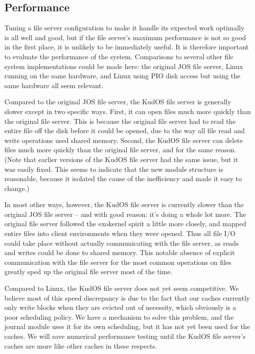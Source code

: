 \subsection{Performance}
\label{sec:eval:performance}

Tuning a file server configuration to make it handle its expected work optimally
is all well and good, but if the file server's maximum performance is not so
good in the first place, it is unlikely to be immediately useful. It is
therefore important to evaluate the performance of the system. Comparisons to
several other file system implementations could be made here: the original JOS
file server, Linux running on the same hardware, and Linux using PIO disk access
but using the same hardware all seem relevant.

Compared to the original JOS file server, the KudOS file server is generally
slower except in two specific ways. First, it can open files much more quickly
than the original file server. This is because the original file server had to
read the entire file off the disk before it could be opened, due to the way all
file read and write operations used shared memory. Second, the KudOS file server
can delete files much more quickly than the original file server, and for the
same reason. (Note that earlier versions of the KudOS file server had the same
issue, but it was easily fixed. This seems to indicate that the new module
structure is reasonable, because it isolated the cause of the inefficiency and
made it easy to change.)

In most other ways, however, the KudOS file server is currently slower than the
original JOS file server -- and with good reason: it's doing a whole lot more.
The original file server followed the exokernel spirit a little more closely,
and mapped entire files into client environments when they were opened. Thus all
file I/O could take place without actually communicating with the file server,
as reads and writes could be done to shared memory. This notable absence of
explicit communication with the file server for the most common operations on
files greatly sped up the original file server most of the time.

Compared to Linux, the KudOS file server does not yet seem competitive. We
believe most of this speed discrepancy is due to the fact that our caches
currently only write blocks when they are evicted out of necessity, which
obviously is a poor scheduling policy. We have a mechanism to solve this
problem, and the journal module uses it for its own scheduling, but it has not
yet been used for the caches. We will save numerical performance testing until
the KudOS file server's caches are more like other caches in these respects.
